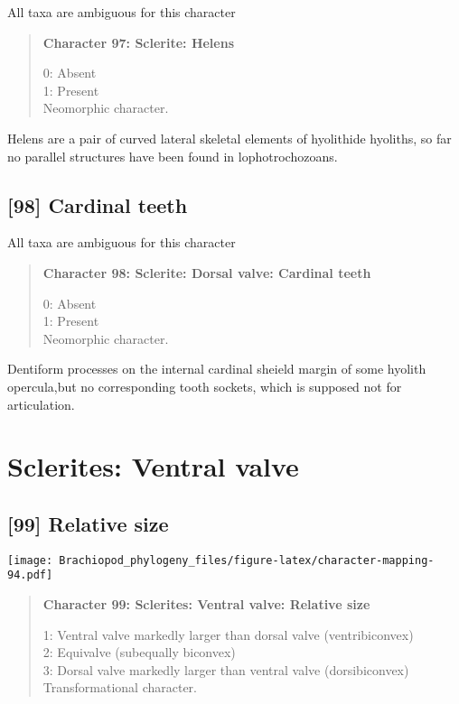 \documentclass[openany]{book}
\theoremstyle{definition}
\theoremstyle{definition}
\theoremstyle{definition}
\theoremstyle{remark}
\begin{document}
All taxa are ambiguous for this character

\begin{quote}
\textbf{Character 97: Sclerite: Helens}

0: Absent\\
1: Present\\
Neomorphic character.
\end{quote}

Helens are a pair of curved lateral skeletal elements of hyolithide
hyoliths, so far no parallel structures have been found in
lophotrochozoans.

\subsection*{{[}98{]} Cardinal teeth}\label{cardinal-teeth}

All taxa are ambiguous for this character

\begin{quote}
\textbf{Character 98: Sclerite: Dorsal valve: Cardinal teeth}

0: Absent\\
1: Present\\
Neomorphic character.
\end{quote}

Dentiform processes on the internal cardinal sheield margin of some
hyolith opercula,but no corresponding tooth sockets, which is supposed
not for articulation.

\section{Sclerites: Ventral valve}\label{sclerites-ventral-valve}

\subsection*{{[}99{]} Relative size}\label{relative-size}

\texttt{[image: Brachiopod\_phylogeny\_files/figure-latex/character-mapping-94.pdf]}

\begin{quote}
\textbf{Character 99: Sclerites: Ventral valve: Relative size}

1: Ventral valve markedly larger than dorsal valve (ventribiconvex)\\
2: Equivalve (subequally biconvex)\\
3: Dorsal valve markedly larger than ventral valve (dorsibiconvex)\\
Transformational character.
\end{quote}
\end{document}
